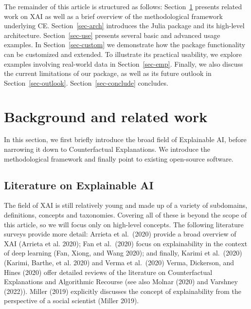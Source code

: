 \documentclass{juliacon}
\begin{document}
The remainder of this article is structured as follows:
Section~\ref{sec-related} presents related work on XAI as well as a
brief overview of the methodological framework underlying CE.
Section~\ref{sec-arch} introduces the Julia package and its high-level
architecture. Section~\ref{sec-use} presents several basic and advanced
usage examples. In Section~\ref{sec-custom} we demonstrate how the
package functionality can be customized and extended. To illustrate its
practical usability, we explore examples involving real-world data in
Section~\ref{sec-emp}. Finally, we also discuss the current limitations
of our package, as well as its future outlook in
Section~\ref{sec-outlook}. Section~\ref{sec-conclude} concludes.

\hypertarget{sec-related}{%
\section{Background and related work}\label{sec-related}}

In this section, we first briefly introduce the broad field of
Explainable AI, before narrowing it down to Counterfactual Explanations.
We introduce the methodological framework and finally point to existing
open-source software.

\hypertarget{literature-on-explainable-ai}{%
\subsection{Literature on Explainable
AI}\label{literature-on-explainable-ai}}

The field of XAI is still relatively young and made up of a variety of
subdomains, definitions, concepts and taxonomies. Covering all of these
is beyond the scope of this article, so we will focus only on high-level
concepts. The following literature surveys provide more detail: Arrieta
et al.~(2020) provide a broad overview of XAI (Arrieta et al. 2020); Fan
et al.~(2020) focus on explainability in the context of deep learning
(Fan, Xiong, and Wang 2020); and finally, Karimi et al.~(2020) (Karimi,
Barthe, et al. 2020) and Verma et al.~(2020) Verma, Dickerson, and Hines
(2020) offer detailed reviews of the literature on Counterfactual
Explanations and Algorithmic Recourse (see also Molnar (2020) and
Varshney (2022)). Miller (2019) explicitly discusses the concept of
explainability from the perspective of a social scientist (Miller 2019).
\end{document}
